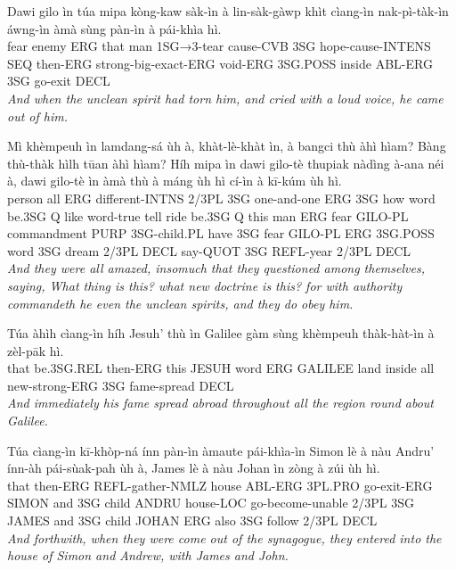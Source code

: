\documentclass[11pt,a4paper]{article}
\begin{document}
\begin{exe}
\gll Dawi gilo ìn túa mipa kòng-kaw sàk-ìn à lin-sàk-gàwp khìt cìang-ìn nak-pì-tàk-ìn áwng-ìn àmà sùng pàn-ìn à pái-khìa hì. \\
     fear enemy ERG that man 1SG→3-tear cause-CVB 3SG hope-cause-INTENS SEQ then-ERG strong-big-exact-ERG void-ERG 3SG.POSS inside ABL-ERG 3SG go-exit DECL \\
\glt \textcolor{kjvcolor}{\textit{And when the unclean spirit had torn him, and cried with a loud voice, he came out of him.}}

\gll Mì khèmpeuh ìn lamdang-sá ùh à, khàt-lè-khàt ìn, à bangci thù àhì hìam? Bàng thù-thàk hìlh tūan àhì hìam? Híh mipa ìn dawi gilo-tè thupiak nàdìng à-ana néi à, dawi gilo-tè ìn àmà thù à máng ùh hì cí-ìn à kī-kúm ùh hì. \\
     person all ERG different-INTNS 2/3PL 3SG one-and-one ERG 3SG how word be.3SG Q like word-true tell ride be.3SG Q this man ERG fear GILO-PL commandment PURP 3SG-child.PL have 3SG fear GILO-PL ERG 3SG.POSS word 3SG dream 2/3PL DECL say-QUOT 3SG REFL-year 2/3PL DECL \\
\glt \textcolor{kjvcolor}{\textit{And they were all amazed, insomuch that they questioned among themselves, saying, What thing is this? what new doctrine is this? for with authority commandeth he even the unclean spirits, and they do obey him.}}

\gll Túa àhìh cìang-ìn híh Jesuh' thù ìn Galilee gàm sùng khèmpeuh thàk-hàt-ìn à zèl-pāk hì. \\
     that be.3SG.REL then-ERG this JESUH word ERG GALILEE land inside all new-strong-ERG 3SG fame-spread DECL \\
\glt \textcolor{kjvcolor}{\textit{And immediately his fame spread abroad throughout all the region round about Galilee.}}

\gll Túa cìang-ìn kī-khòp-ná ínn pàn-ìn àmaute pái-khìa-ìn Simon lè à nàu Andru' ínn-àh pái-sùak-pah ùh à, James lè à nàu Johan ìn zòng à zúi ùh hì. \\
     that then-ERG REFL-gather-NMLZ house ABL-ERG 3PL.PRO go-exit-ERG SIMON and 3SG child ANDRU house-LOC go-become-unable 2/3PL 3SG JAMES and 3SG child JOHAN ERG also 3SG follow 2/3PL DECL \\
\glt \textcolor{kjvcolor}{\textit{And forthwith, when they were come out of the synagogue, they entered into the house of Simon and Andrew, with James and John.}}


\end{exe}
\end{document}
